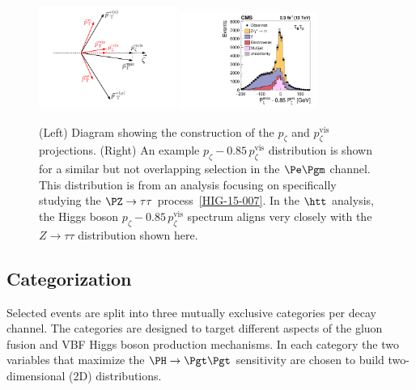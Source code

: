 \begin{figure}[htbp]
\centering
     \includegraphics[width=0.4\textwidth]{higgs_to_taus/plots/pZeta_def.pdf}
     \includegraphics[width=0.4\textwidth]{higgs_to_taus/plots/htt_em_pZeta.pdf}\\
     \caption{
(Left) Diagram showing the construction of the $p_\zeta$ and $p_\zeta^{\text{vis}}$ projections.
(Right) An example $p_\zeta - 0.85 \, p_\zeta^{\text{vis}}$ distribution is shown for a similar but not
overlapping selection in the $\Pe\Pgm$ channel.  This distribution is from an analysis focusing on specifically studying the
$\PZ\to\tau\tau$ process~\ref{HIG-15-007}.
In the $\htt$ analysis, the Higgs boson $p_\zeta - 0.85 \, p_\zeta^{\text{vis}}$
spectrum aligns very closely with the $Z\to\tau\tau$ distribution shown here.
     }
     \label{fig:htt_pZeta}
\end{figure}

\subsection{Categorization}

Selected events are split into three mutually exclusive categories per decay channel.
The categories are designed to target different aspects of the gluon fusion and VBF Higgs boson production mechanisms.
In each category the two variables that maximize the $\PH\to\Pgt\Pgt$ sensitivity are chosen to build 
two-dimensional (2D) distributions.

